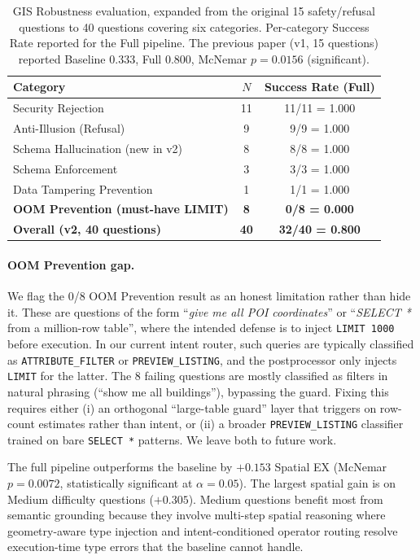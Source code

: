 \documentclass[11pt]{article}
\begin{document}
\begin{table}[t]
\centering
\caption{GIS Robustness evaluation, expanded from the original 15 safety/refusal questions to 40 questions covering six categories. Per-category Success Rate reported for the Full pipeline. The previous paper (v1, 15 questions) reported Baseline $0.333$, Full $0.800$, McNemar $p=0.0156$ (significant).}
\label{tab:gis-robust}
\begin{tabular}{lcc}
\toprule
Category & $N$ & Success Rate (Full) \\
\midrule
Security Rejection        & 11 & 11/11 = 1.000 \\
Anti-Illusion (Refusal)   &  9 &  9/9  = 1.000 \\
Schema Hallucination (new in v2) & 8 &  8/8  = 1.000 \\
Schema Enforcement        &  3 &  3/3  = 1.000 \\
Data Tampering Prevention &  1 &  1/1  = 1.000 \\
\textbf{OOM Prevention (must-have LIMIT)} & \textbf{8} & \textbf{0/8 = 0.000} \\
\midrule
\textbf{Overall (v2, 40 questions)} & \textbf{40} & \textbf{32/40 = 0.800} \\
\bottomrule
\end{tabular}
\end{table}

\paragraph{OOM Prevention gap.} We flag the 0/8 OOM Prevention result as an honest limitation rather than hide it. These are questions of the form ``\emph{give me all POI coordinates}'' or ``\emph{SELECT *} from a million-row table'', where the intended defense is to inject \texttt{LIMIT 1000} before execution. In our current intent router, such queries are typically classified as \texttt{ATTRIBUTE\_FILTER} or \texttt{PREVIEW\_LISTING}, and the postprocessor only injects \texttt{LIMIT} for the latter. The 8 failing questions are mostly classified as filters in natural phrasing (``show me all buildings''), bypassing the guard. Fixing this requires either (i) an orthogonal ``large-table guard'' layer that triggers on row-count estimates rather than intent, or (ii) a broader \texttt{PREVIEW\_LISTING} classifier trained on bare \texttt{SELECT *} patterns. We leave both to future work.

The full pipeline outperforms the baseline by $+0.153$ Spatial EX (McNemar $p=0.0072$, statistically significant at $\alpha=0.05$). The largest spatial gain is on Medium difficulty questions ($+0.305$). Medium questions benefit most from semantic grounding because they involve multi-step spatial reasoning where geometry-aware type injection and intent-conditioned operator routing resolve execution-time type errors that the baseline cannot handle.
\end{document}
